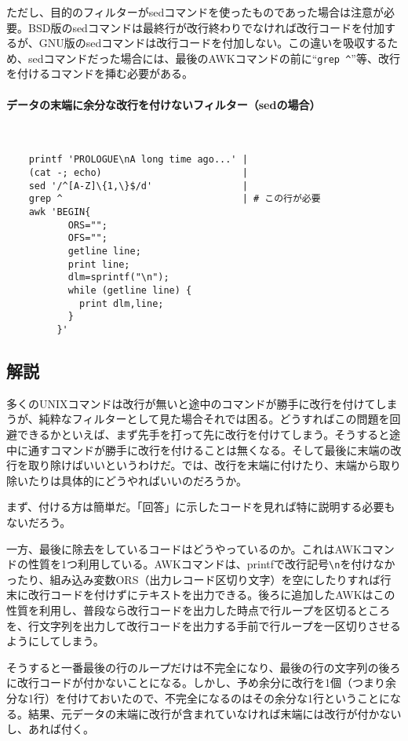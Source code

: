ただし、目的のフィルターがsedコマンドを使ったものであった場合は注意が必要。BSD版のsedコマンドは最終行が改行終わりでなければ改行コードを付加するが、GNU版のsedコマンドは改行コードを付加しない。この違いを吸収するため、sedコマンドだった場合には、最後のAWKコマンドの前に``\verb|grep ^|''等、改行を付けるコマンドを挿む必要がある。

\paragraph{データの末端に余分な改行を付けないフィルター（sedの場合）} 　\\
\begin{frameboxit}{160.0mm}
\begin{verbatim}
	printf 'PROLOGUE\nA long time ago...' |
	(cat -; echo)                         |
	sed '/^[A-Z]\{1,\}$/d'                |
	grep ^                                | # この行が必要
	awk 'BEGIN{
	       ORS="";
	       OFS="";
	       getline line;
	       print line;
	       dlm=sprintf("\n");
	       while (getline line) {
	         print dlm,line;
	       }
	     }'
\end{verbatim}
\end{frameboxit}

\subsection*{解説}

多くのUNIXコマンドは改行が無いと途中のコマンドが勝手に改行を付けてしまうが、純粋なフィルターとして見た場合それでは困る。どうすればこの問題を回避できるかといえば、まず先手を打って先に改行を付けてしまう。そうすると途中に通すコマンドが勝手に改行を付けることは無くなる。そして最後に末端の改行を取り除けばいいというわけだ。では、改行を末端に付けたり、末端から取り除いたりは具体的にどうやればいいのだろうか。

まず、付ける方は簡単だ。「回答」に示したコードを見れば特に説明する必要もないだろう。

一方、最後に除去をしているコードはどうやっているのか。これはAWKコマンドの性質を1つ利用している。AWKコマンドは、printfで改行記号\verb|\n|を付けなかったり、組み込み変数ORS（出力レコード区切り文字）を空にしたりすれば行末に改行コードを付けずにテキストを出力できる。後ろに追加したAWKはこの性質を利用し、普段なら改行コードを出力した時点で行ループを区切るところを、行文字列を出力して改行コードを出力する手前で行ループを一区切りさせるようにしてしまう。

そうすると一番最後の行のループだけは不完全になり、最後の行の文字列の後ろに改行コードが付かないことになる。しかし、予め余分に改行を1個（つまり余分な1行）を付けておいたので、不完全になるのはその余分な1行ということになる。結果、元データの末端に改行が含まれていなければ末端には改行が付かないし、あれば付く。


